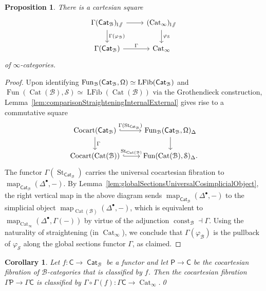 \documentclass[reqno]{amsart}
\numberwithin{equation}{subsection}
\theoremstyle{plain}
\newtheorem{proposition}[equation]{Proposition}
\newtheorem{corollary}[equation]{Corollary}
\theoremstyle{definition}
\let\scr=\mathcal
\let\phi=\varphi
\def\BB{\scr B}
\def\SS{\scr S}
\DeclareMathOperator{\Cat}{Cat}
\DeclareMathOperator{\ICat}{\mathsf{Cat}}
\DeclareMathOperator{\Cocart}{Cocart}
\DeclareMathOperator{\LFib}{LFib}
\DeclareMathOperator{\Fun}{Fun}
\DeclareMathOperator{\Map}{map}
\DeclareMathOperator{\const}{const}
\DeclareMathOperator{\St}{St}
\newcommand{\map}[1]{\Map_{#1}}
\newcommand{\sslash}{\mathbin{/\mkern-6mu/}}
\newcommand{\I}[1]{\mathsf{#1}}
\newcommand{\Simp}[1]{#1_{\Delta}}
\newcommand{\LaxUnder}[2]{#1_{\hspace{-1pt}#2\sslash}}
\newcommand{\CatS}{\Cat_{\infty}}
\begin{document}
\begin{proposition}
	\label{prop:globalSectionsUniversalCocartesianFibration}
	There is a cartesian square
	\begin{equation*}
	\begin{tikzcd}
	\Gamma\LaxUnder{(\ICat_{\BB})}{1}\arrow[d, "\Gamma(\phi_{\BB})"]\arrow[r] & \LaxUnder{(\CatS)}{1}\arrow[d, "\phi_{\SS}"]\\
	\Gamma (\ICat_{\BB})\arrow[r, "\Gamma"] & \CatS
	\end{tikzcd}
	\end{equation*}
	of $\infty$-categories.
\end{proposition}
\begin{proof}
	Upon identifying $\Fun_{\BB}(\ICat_{\BB},\Univ)\simeq \LFib(
	\ICat_{\BB})$ and $\Fun(\Cat(\BB),\SS)\simeq\LFib(\Cat(\BB))$ via the Grothendieck construction, Lemma~\ref{lem:comparisonStraighteningInternalExternal} gives rise to a commutative square
	\begin{equation*}
	\begin{tikzcd}
			\Cocart(\ICat_{\BB})\arrow[r, hookrightarrow, "\Gamma(\St_{\ICat_{\BB}})"] \arrow[d, "\Gamma"]& \Simp{\Fun_{\BB}(\ICat_{\BB},\Univ)}\arrow[d]\\
			\Cocart(\Cat(\BB))\arrow[r, hookrightarrow, "\St_{\Cat(\BB)}"] & \Simp{\Fun(\Cat(\BB),\SS)}.
	\end{tikzcd}
	\end{equation*}
	The functor $\Gamma(\St_{\ICat_{\BB}})$ carries the universal cocartesian fibration to $\map{\ICat_{\BB}}(\Delta^{\bullet},-)$. By Lemma~\ref{lem:globalSectionsUniversalCosimplicialObject}, the right vertical map in the above diagram sends $\map{\ICat_{\BB}}(\Delta^{\bullet},-)$ to the simplicial object $\map{\Cat(\BB)}(\Delta^{\bullet},-)$, which is equivalent to $\map{\CatS}(\Delta^\bullet,\Gamma(-))$ by virtue of the adjunction $\const_\BB\dashv \Gamma$. Using the naturality of straightening (in $\CatS$), we conclude that $\Gamma(\phi_{\BB})$ is the pullback of $\phi_{\SS}$ along the global sections functor $\Gamma$, as claimed.
\end{proof}
\begin{corollary}
	\label{cor:StraighteningGlobalSections}
	Let $f\colon \I{C}\to\ICat_{\BB}$ be a functor and let $\I{P}\to\I{C}$ be the cocartesian fibration of $\BB$-categories that is classified by $f$. Then the cocartesian fibration $\Gamma\I{P}\to\Gamma\I{C}$ is classified by $\Gamma\circ\Gamma(f)\colon \Gamma\I{C}\to\CatS$.\qed
\end{corollary}
\end{document}
